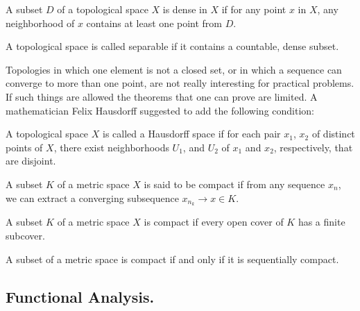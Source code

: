 \begin{definition}
	A subset $D$ of a topological space $X$ is dense in $X$ if for any point $x$ in $X$, any neighborhood of $x$ contains at least one point from $D$.
\end{definition}

\begin{definition}
	A topological space is called separable if it contains a countable, dense subset.
\end{definition}

Topologies in which one element is not a closed set, or in which a sequence can converge to more than one point, are not really interesting for practical problems. If such things are allowed the theorems that one can prove are limited. A mathematician Felix Hausdorff suggested to add the following condition:
  
\begin{definition}
A topological space $X$ is called a Hausdorff space if for each pair $x_1$, $x_2$ of distinct points of $X$, there exist neighborhoods $U_1$, and $U_2$ of $x_1$ and $x_2$, respectively, that are disjoint. 
\end{definition}

\begin{definition}
\end{definition}


\begin{definition}
	A subset $K$ of a metric space $X$ is said to be compact if from any sequence $x_n$, we can extract a converging subsequence $x_{n_k} \rightarrow x \in K$.
\end{definition}

\begin{definition}[Compactness]
		A subset $K$ of a metric space $X$ is compact if every open cover of $K$ has a finite subcover. 
\end{definition}

\begin{theorem}
	A subset of a metric space is compact if and only if it is sequentially compact.
\end{theorem}


\subsection{Functional Analysis.}

